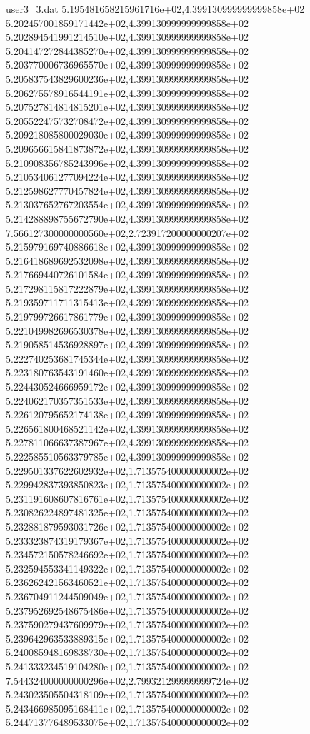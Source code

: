 \begin{filecontents}{user3_3.dat}
5.195481658215961716e+02,4.399130999999999858e+02
5.202457001859171442e+02,4.399130999999999858e+02
5.202894541991214510e+02,4.399130999999999858e+02
5.204147272844385270e+02,4.399130999999999858e+02
5.203770006736965570e+02,4.399130999999999858e+02
5.205837543829600236e+02,4.399130999999999858e+02
5.206275578916544191e+02,4.399130999999999858e+02
5.207527814814815201e+02,4.399130999999999858e+02
5.205522475732708472e+02,4.399130999999999858e+02
5.209218085800029030e+02,4.399130999999999858e+02
5.209656615841873872e+02,4.399130999999999858e+02
5.210908356785243996e+02,4.399130999999999858e+02
5.210534061277094224e+02,4.399130999999999858e+02
5.212598627770457824e+02,4.399130999999999858e+02
5.213037652767203554e+02,4.399130999999999858e+02
5.214288898755672790e+02,4.399130999999999858e+02
7.566127300000000560e+02,2.723917200000000207e+02
5.215979169740886618e+02,4.399130999999999858e+02
5.216418689692532098e+02,4.399130999999999858e+02
5.217669440726101584e+02,4.399130999999999858e+02
5.217298115817222879e+02,4.399130999999999858e+02
5.219359711711315413e+02,4.399130999999999858e+02
5.219799726617861779e+02,4.399130999999999858e+02
5.221049982696530378e+02,4.399130999999999858e+02
5.219058514536928897e+02,4.399130999999999858e+02
5.222740253681745344e+02,4.399130999999999858e+02
5.223180763543191460e+02,4.399130999999999858e+02
5.224430524666959172e+02,4.399130999999999858e+02
5.224062170357351533e+02,4.399130999999999858e+02
5.226120795652174138e+02,4.399130999999999858e+02
5.226561800468521142e+02,4.399130999999999858e+02
5.227811066637387967e+02,4.399130999999999858e+02
5.222585510563379785e+02,4.399130999999999858e+02
5.229501337622602932e+02,1.713575400000000002e+02
5.229942837393850823e+02,1.713575400000000002e+02
5.231191608607816761e+02,1.713575400000000002e+02
5.230826224897481325e+02,1.713575400000000002e+02
5.232881879593031726e+02,1.713575400000000002e+02
5.233323874319179367e+02,1.713575400000000002e+02
5.234572150578246692e+02,1.713575400000000002e+02
5.232594553341149322e+02,1.713575400000000002e+02
5.236262421563460521e+02,1.713575400000000002e+02
5.236704911244509049e+02,1.713575400000000002e+02
5.237952692548675486e+02,1.713575400000000002e+02
5.237590279437609979e+02,1.713575400000000002e+02
5.239642963533889315e+02,1.713575400000000002e+02
5.240085948169838730e+02,1.713575400000000002e+02
5.241333234519104280e+02,1.713575400000000002e+02
7.544324000000000296e+02,2.799321299999999724e+02
5.243023505504318109e+02,1.713575400000000002e+02
5.243466985095168411e+02,1.713575400000000002e+02
5.244713776489533075e+02,1.713575400000000002e+02

\end{filecontents}
